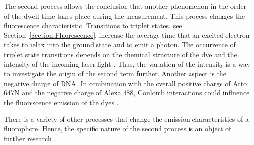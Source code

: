 The second process allows the conclusion that another phenomenon in the order of the dwell time takes place during the measurement. This process changes the fluorescence characteristic. Transitions to triplet states, see Section~\ref{Section:Fluorescence}, increase the average time that an excited electron takes to relax into the ground state and to emit a photon. The occurrence of triplet state transitions depends on the chemical structure of the dye and the intensity of the incoming laser light \cite{Lakowicz2006}. Thus, the variation of the intensity is a way to investigate the origin of the second term further. Another aspect is the negative charge of DNA. In combination with the overall positive charge of Atto 647N and the negative charge of Alexa 488, Coulomb interactions could influence the fluorescence emission of the dyes \cite{ZanettiDomingues2013}. 

There is a variety of other processes that change the emission characteristics of a fluorophore. Hence, the specific nature of the second process is an object of further research \cite{Bielec2020}.